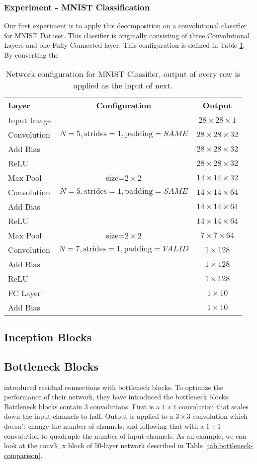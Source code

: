 \subsubsection{Experiment - MNIST Classification}
Our first experiment is to apply this decomposition on a convolutional classifier for MNIST Dataset. This classifier is originally consisting of three Convolutional Layers and one Fully Connected layer. This configuration is defined in Table \ref{tab:nxn-mnist-classifier}. By converting the 
\begin{table}
\centering
\begin{tabular}{l | c | c}
Layer & Configuration & Output\\
\hline
Input Image & & $28 \times 28 \times 1$ \\
\hline
Convolution & \small $N=5, \text{strides}=1, \text{padding}=SAME$ & $28 \times 28 \times 32$ \\
Add Bias & & $28 \times 28 \times 32$ \\
ReLU & & $28 \times 28 \times 32$ \\
Max Pool & size=$ 2 \times 2$ & $14 \times 14 \times 32$ \\
\hline
Convolution & \small $N=5, \text{strides}=1, \text{padding}=SAME$ & $14 \times 14 \times 64$ \\
Add Bias & & $14 \times 14 \times 64$ \\
ReLU & & $14 \times 14 \times 64$ \\
Max Pool & size=$ 2 \times 2$ & $7 \times 7 \times 64$ \\
\hline
Convolution & \small $N=7, \text{strides}=1, \text{padding}=VALID$ & $1 \times 128$ \\
Add Bias & & $ 1 \times 128$ \\
ReLU & & $ 1 \times 128$ \\
\hline
FC Layer &  & $1 \times 10$ \\
Add Bias & & $1 \times 10$ 
\end{tabular}
\caption{Network configuration for MNIST Classifier, output of every row is applied as the input of next.}
\label{tab:nxn-mnist-classifier}
\end{table}

\subsection{Inception Blocks}
\subsection{Bottleneck Blocks}
\cite{He:2015aa} introduced residual connections with bottleneck blocks. To optimize the performance of their network, they have introduced the bottleneck blocks. Bottleneck blocks contain 3 convolutions. First is a $ 1 \times 1$ convolution that scales down the input channels to half. Output is applied to a $3 \times 3$ convolution which doesn't change the number of channels, and following that with a $1 \times 1$ convolution to quadruple the number of input channels. As an example, we can look at the conv3\_x block of 50-layer network described in Table \ref{tab:bottleneck-comparison}.

